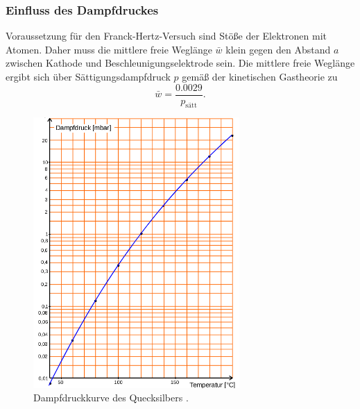 \subsubsection{Einfluss des Dampfdruckes}
Voraussetzung für den Franck-Hertz-Versuch sind Stöße der Elektronen mit Atomen.
Daher muss die mittlere freie Weglänge $\bar{w}$ klein gegen den Abstand $a$ zwischen Kathode
und Beschleunigungselektrode sein.
Die mittlere freie Weglänge ergibt sich über Sättigungsdampfdruck $p$ gemäß der kinetischen
Gastheorie zu
\begin{equation}
	\label{eqn:freiewegl}
	\bar{w} = \frac{0.0029}{p_{\mathrm{sätt}}} \mathrm{.}
\end{equation}
\begin{figure}
  \centering
  \includegraphics[width=0.7\textwidth]{Bilder/dampfdruckkurve.png}
  \caption{Dampfdruckkurve des Quecksilbers \cite{Anleitung}.}
  \label{fig:dampfi}
\end{figure}
